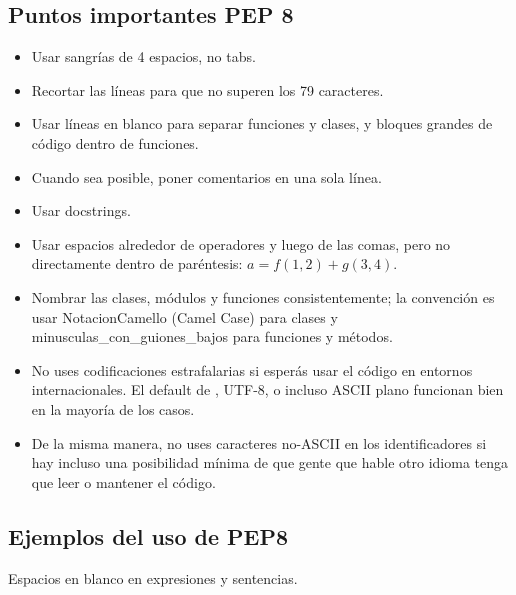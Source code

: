 \subsection{Puntos importantes PEP 8}
\begin{itemize}
\item Usar sangrías de 4 espacios, no tabs.
\item Recortar las líneas para que no superen los 79 caracteres.
\item Usar líneas en blanco para separar funciones y clases, y bloques grandes de código dentro de funciones.
\item Cuando sea posible, poner comentarios en una sola línea.
\item Usar docstrings.
\item Usar espacios alrededor de operadores y luego de las comas, pero no directamente dentro de paréntesis: $a = f(1, 2) + g(3, 4)$.
\item Nombrar las clases, módulos y funciones consistentemente; la convención es usar NotacionCamello (Camel Case) para clases y minusculas\_con\_guiones\_bajos para funciones y métodos.
\item No uses codificaciones estrafalarias si esperás usar el código en entornos internacionales. El default de \python, UTF-8, o incluso ASCII plano funcionan bien en la mayoría de los casos.
\item De la misma manera, no uses caracteres no-ASCII en los identificadores si hay incluso una  posibilidad mínima de que gente que hable otro idioma tenga que leer o mantener el código.
\end{itemize}
\subsection{Ejemplos del uso de PEP8}
Espacios en blanco en expresiones y sentencias.

